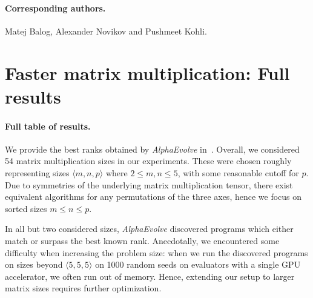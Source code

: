 \documentclass[logo,copyright,12pt]{googledeepmind}
\theoremstyle{definition}
\theoremstyle{remark}
\theoremstyle{plain}
\newcommand{\method}{\emph{AlphaEvolve}\xspace}
\begin{document}
\paragraph{Corresponding authors.}
Matej Balog, Alexander Novikov and Pushmeet Kohli.





\clearpage
\appendix


\section{Faster matrix multiplication: Full results}

\paragraph{Full table of results.} We provide the best ranks obtained by \method in~. Overall, we considered 54 matrix multiplication sizes in our experiments. These were chosen roughly representing sizes $\langle m,n,p \rangle$ where $2\leq m,n\leq 5$, with some reasonable cutoff for $p$. Due to symmetries of the underlying matrix multiplication tensor, there exist equivalent algorithms for any permutations of the three axes, hence we focus on sorted sizes $m\leq n\leq p$.

In all but two considered sizes, \method discovered programs which either match or surpass the best known rank. Anecdotally, we encountered some difficulty when increasing the problem size: when we run the discovered programs on sizes beyond $\langle 5,5,5 \rangle$ on 1000 random seeds on evaluators with a single GPU accelerator, we often run out of memory. Hence, extending our setup to larger matrix sizes requires further optimization.
\end{document}
